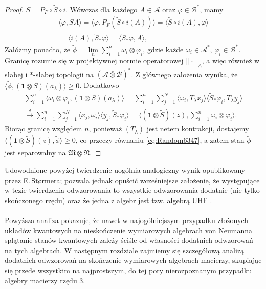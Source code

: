 \begin{proof}
$S = P_{F} \circ \tilde{S} \circ i$.
Wówczas dla każdego $A \in \mathcal{A}$ oraz $\varphi \in \mathcal{B}^{*}$,
mamy
\begin{eqnarray}
\langle \varphi, SA \rangle =
\langle \varphi, P_{F} ( \tilde{S} \circ i (A)) \rangle =
\langle  \tilde{S} \circ i (A), \varphi \rangle \nonumber\\
=\langle i(A), \tilde{S}_{*} \varphi \rangle =
\langle \tilde{S}_{*} \varphi, A \rangle,
\end{eqnarray}
Załóżmy ponadto, że
$\tilde{\phi} = \lim \limits_{n} \sum_{i=1}^{n}\omega_{i} \otimes \varphi_{i}$,
gdzie każde $\omega_{i} \in \mathcal{A}^{*}$,
$\varphi_{i} \in \mathcal{B}^{*}$.
Granicę rozumie się w projektywnej normie operatorowej $|| \cdot ||_{\wedge}$,
a więc również w słabej i *-słabej topologii na
$(\mathcal{A} \bar{\otimes} \mathcal{B})^{*}$.
Z głównego założenia wynika, że
$\langle \tilde{\phi},(\mathbf{1} \otimes S) (a_{\lambda}) \rangle \geq 0$. Dodatkowo
\begin{eqnarray}
\sum \limits_{i=1}^{n}\langle \omega_{i} \otimes \varphi_{i},
(\mathbf{1} \otimes S)(a_{\lambda}) \rangle =
\sum \limits_{i=1}^{n} \sum \limits_{j=1}^{N}
\langle \omega_{i} , T_{\lambda} x_{j} \rangle
\langle \tilde{S}_{*} \varphi_{i}, T_{\lambda} y_{j}\rangle \nonumber\\
\stackrel{\lambda}{\longrightarrow}\sum \limits_{i=1}^{n} \sum \limits_{j=1}^{N}
\langle  x_{j}, \omega_{i} \rangle\langle  y_{j},  \tilde{S}_{*} \varphi_{i} \rangle =
\langle (\mathbf{1} \otimes \tilde{S})(z),
\sum \limits_{i=1}^{n} \omega_{i} \otimes \varphi_{i} \rangle .
\end{eqnarray}
Biorąc granicę względem $n$,
ponieważ $(T_{\lambda})$ jest netem kontrakcji, dostajemy
$\langle (\mathbf{1} \otimes \tilde{S}) (z) ,
\tilde{\phi}\rangle \geq 0$,
co przeczy równaniu \eqref{eq:Random6347},
a zatem stan $\tilde{\phi}$ jest separowalny na
$\mathfrak{M} \bar{\otimes} \mathfrak{N}$.
\end{proof}

Udowodnione powyżej twierdzenie uogólnia analogiczny wynik opublikowany przez
E.\,St{\o}rmera; pozwala jednak opuścić wcześniejsze założenie, że występujące
w tezie twierdzenia odwzorowania to wszystkie odwzorowania dodatnie
(nie tylko skończonego rzędu) oraz że jedna z algebr jest tzw. algebrą
UHF \cite{stormer2009separable}.

\paragraph{}
Powyższa analiza pokazuje, że nawet w najogólniejszym przypadku złożonych
układów kwantowych na nieskończenie wymiarowych algebrach von Neumanna
splątanie stanów kwantowych zależy ściśle od własności dodatnich odwzorowań
na tych algebrach.
W następnym rozdziale zajmiemy się szczegółową analizą dodatnich odwzorowań
na skończenie wymiarowych algebrach macierzy, skupiając się przede wszystkim
na najprostszym, do tej pory nierozpoznanym przypadku algebry macierzy
rzędu 3.
